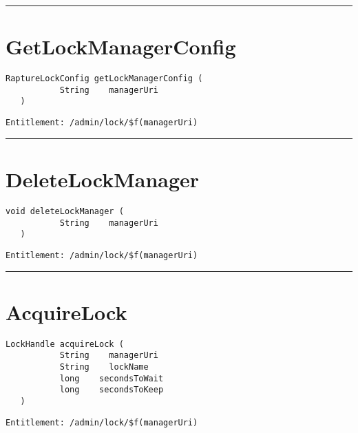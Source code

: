 \rule{12cm}{2pt}
\section{GetLockManagerConfig}
\label{Api:GetLockManagerConfig}
\begin{lstlisting}[style=nonumbers]
   RaptureLockConfig getLockManagerConfig (
           String    managerUri
   )
\end{lstlisting}
\begin{Verbatim}[formatcom=\color{Maroon}]
  Entitlement: /admin/lock/$f(managerUri)
\end{Verbatim}



\rule{12cm}{2pt}
\section{DeleteLockManager}
\label{Api:DeleteLockManager}
\begin{lstlisting}[style=nonumbers]
   void deleteLockManager (
           String    managerUri
   )
\end{lstlisting}
\begin{Verbatim}[formatcom=\color{Maroon}]
  Entitlement: /admin/lock/$f(managerUri)
\end{Verbatim}



\rule{12cm}{2pt}
\section{AcquireLock}
\label{Api:AcquireLock}
\begin{lstlisting}[style=nonumbers]
   LockHandle acquireLock (
           String    managerUri
           String    lockName
           long    secondsToWait
           long    secondsToKeep
   )
\end{lstlisting}
\begin{Verbatim}[formatcom=\color{Maroon}]
  Entitlement: /admin/lock/$f(managerUri)
\end{Verbatim}



